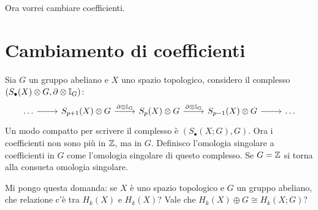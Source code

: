 Ora vorrei cambiare coefficienti.

\section{Cambiamento di coefficienti}

Sia $ G $ un gruppo abeliano e $ X $ uno spazio topologico, considero il complesso
$ (S_\bullet(X) \otimes G, \partial \otimes \mathbb{I}_{G}) $:
\[
  \begin{tikzcd}
    \dots \rar & S_{p+1}(X) \otimes G \rar{\partial \otimes \Id{G}} & S_p(X) \otimes G \rar{\partial \otimes \Id{G}} & S_{p-1}(X) \otimes G \rar & \dots
  \end{tikzcd}
\]
Un modo compatto per scrivere il complesso è $ (S_\bullet(X;G), G) $. Ora i coefficienti non
sono più in $ \mathbb{Z} $, ma in $ G $. Definisco l'omologia singolare a coefficienti in $ G $
come l'omologia singolare di questo complesso. Se $ G = \mathbb{Z} $ si torna alla consueta omologia
singolare.

Mi pongo questa domanda: se $ X $ è uno spazio topologico e $ G $ un gruppo abeliano, che relazione
c'è tra $ H_k(X) $ e $ H_k(X) $? Vale che $ H_k(X) \oplus G \cong H_k(X;G) $?

